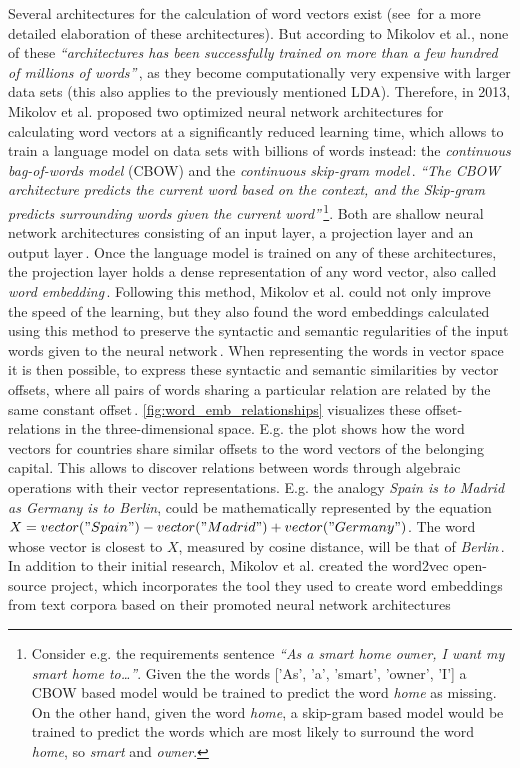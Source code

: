 Several architectures for the calculation of word vectors exist (see\,\cite{mikolov_efficient_2013,mikolov_linguistic_2013} for a more detailed elaboration of these architectures). But according to Mikolov et al., none of these \textit{``architectures has been successfully trained on more than a few hundred of millions of words''}\,\cite[p1]{mikolov_efficient_2013}, as they become computationally very expensive with larger data sets (this also applies to the previously mentioned LDA). Therefore, in 2013, Mikolov et al. proposed two optimized neural network architectures for calculating word vectors at a significantly reduced learning time, which allows to train a language model on data sets with billions of words instead: the \emph{continuous bag-of-words model} (CBOW) and the \emph{continuous skip-gram model}\,\cite{mikolov_efficient_2013}.
\textit{``The CBOW architecture predicts the current word based on the context, and the Skip-gram predicts surrounding words given the current word''}\,\cite{mikolov_efficient_2013}\footnote{Consider e.g. the requirements sentence \textit{``As a smart home owner, I want my smart home to\dots''}. Given the the words ['As', 'a', 'smart', 'owner', 'I'] a CBOW based model would be trained to predict the word \textit{home} as missing. On the other hand, given the word \textit{home}, a skip-gram based model would be trained to predict the words which are most likely to surround the word \textit{home}, so \textit{smart} and \textit{owner}.}. Both are shallow neural network architectures consisting of an input layer, a projection layer and an output layer\,\cite{mikolov_efficient_2013,qiang_topic_2016}. Once the language model is trained on any of these architectures, the projection layer holds a dense representation of any word vector, also called \textit{word embedding}\,\cite{tensorflow_word_embeddings}. Following this method, Mikolov et al. could not only improve the speed of the learning, but they also found the word embeddings calculated using this method to preserve the syntactic and semantic regularities of the input words given to the neural network\,\cite{mikolov_linguistic_2013}. When representing the words in vector space it is then possible, to express these syntactic and semantic similarities by vector offsets, where all pairs of words sharing a particular relation are related by the same constant offset\,\cite{mikolov_linguistic_2013}. \autoref{fig:word_emb_relationships} visualizes these offset-relations in the three-dimensional space. E.g. the  plot shows how the word vectors for countries share similar offsets to the word vectors of the belonging capital. This allows to discover relations between words through algebraic operations with their vector representations. E.g. the analogy \textit{Spain is to Madrid as Germany is to Berlin}, could be mathematically represented by the equation $X = vector("Spain") - vector("Madrid") + vector("Germany")$. The word whose vector is closest to $X$, measured by cosine distance, will be that of \textit{Berlin}\,\cite{mikolov_efficient_2013}. In addition to their initial research, Mikolov et al. created the word2vec open-source project, which incorporates the tool they used to create word embeddings from text corpora based on their promoted neural network architectures 